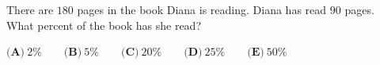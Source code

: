 There are $180$ pages in the book Diana is reading. Diana has read $90$ pages. What percent of the book has she read?

$\textbf{(A)}\ 2\%\qquad\textbf{(B)}\ 5\%\qquad\textbf{(C)}\ 20\%\qquad\textbf{(D)}\ 25\%\qquad\textbf{(E)}\ 50\%$
